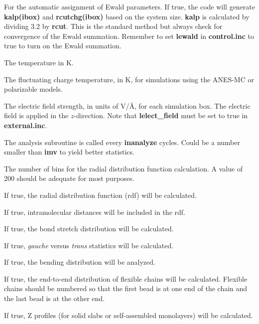 \documentclass[12pt,letterpaper]{article}
\begin{document}
 For the automatic assignment of Ewald parameters.  
If true, the code will generate {\textbf{kalp(ibox)}} and {\textbf{rcutchg(ibox)}} based on the
system size.  {\textbf{kalp}} is calculated by dividing 3.2 by {\textbf{rcut}}.  
This is the standard method but always check for convergence of the Ewald summation.
Remember to set {\textbf{lewald}} in {\textbf{control.inc}} to true to turn on the Ewald summation.

 The temperature in K.  
	
 The fluctuating charge temperature, in K, for
simulations using the ANES-MC or polarizable models.

 The electric field strength, in units of V/\AA, for each simulation box.  The electric 
field is applied in the $z$-direction.  Note that {\textbf{lelect\_field}} must be set to true in {\textbf{external.inc}}.

 The analysis subroutine is called every {\textbf{inanalyze}} cycles. 
Could be a number smaller than {\textbf{imv}} to yield better statistics.

 The number of bins for the radial distribution function calculation. 
A value of 200 should be adequate for most purposes.

 If true, the radial distribution function (rdf) will be calculated.

 If true, intramolecular distances will be included in the rdf.

 If true, the bond stretch distribution will be calculated.

 If true, {\textit{gauche}} versus {\textit{trans}} statistics will be calculated.

 If true, the bending distribution will be analyzed.

 If true, the end-to-end distribution of flexible chains will be calculated.  
Flexible chains should be numbered so that the first bead is at one end of the chain and the last
bead is at the other end.

 If true, Z profiles (for solid slabs or self-assembled monolayers) will be calculated.
\end{document}
